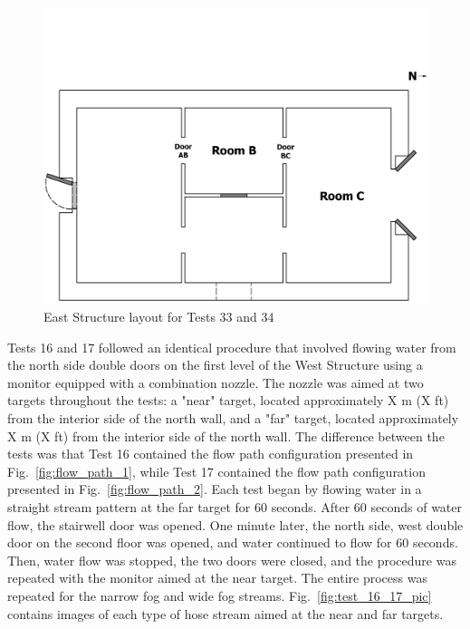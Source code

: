 \documentclass[12pt,oneside]{book}
\begin{document}
\begin{figure}[!ht]
\includegraphics[trim=0cm 0cm 0cm 4.5cm, clip=true, width=6in]{../Drawings/Specific_Tests/East_Structure_Hose_Test_33_34}
\caption[East Structure Layout for Tests 33 and 34]{East Structure layout for Tests 33 and 34}
\label{fig:test_33_34_setup}
\end{figure}
\FloatBarrier

Tests 16 and 17 followed an identical procedure that involved flowing water from the north side double doors on the first level of the West Structure using a monitor equipped with a combination nozzle. The nozzle was aimed at two targets throughout the tests: a "near" target, located approximately X m (X ft) from the interior side of the north wall, and a "far" target, located approximately X m (X ft) from the interior side of the north wall. The difference between the tests was that Test 16 contained the flow path configuration presented in Fig.~\ref{fig:flow_path_1}, while Test 17 contained the flow path configuration presented in Fig.~\ref{fig:flow_path_2}. Each test began by flowing water in a straight stream pattern at the far target for 60 seconds. After 60 seconds of water flow, the stairwell door was opened. One minute later, the north side, west double door on the second floor was opened, and water continued to flow for 60 seconds. Then, water flow was stopped, the two doors were closed, and the procedure was repeated with the monitor aimed at the near target. The entire process was repeated for the narrow fog and wide fog streams. Fig.~\ref{fig:test_16_17_pic} contains images of each type of hose stream aimed at the near and far targets.
\end{document}
